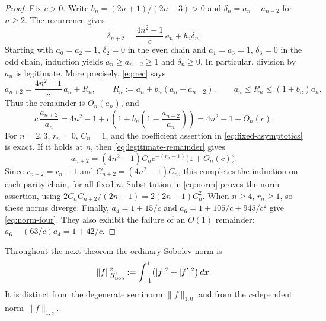 ﻿\documentclass[11pt]{article}
\begin{document}
\begin{proof}
	Fix $c>0$.  Write $b_n=(2n+1)/(2n-3)>0$ and
	$\delta_n=a_n-a_{n-2}$ for $n\ge2$.  The recurrence gives
	\begin{equation*}
		\delta_{n+2}=\frac{4n^2-1}{c}\,a_n+b_n\delta_n.
	\end{equation*}
	Starting with $a_0=a_2=1$, $\delta_2=0$ in the even chain and
	$a_1=a_3=1$, $\delta_3=0$ in the odd chain, induction yields
	$a_n\ge a_{n-2}\ge1$ and $\delta_n\ge0$.  In particular, division
	by $a_n$ is legitimate.  More precisely, \eqref{eq:rec} says
	\begin{equation}
		a_{n+2}=\frac{4n^2-1}{c}\,a_n+R_n,\qquad
		R_n:=a_n+b_n(a_n-a_{n-2}),\qquad
		a_n\le R_n\le(1+b_n)a_n.
		\label{eq:legitimate-remainder}
	\end{equation}
	Thus the remainder is $O_n(a_n)$, and
	\begin{equation}
		c\,\frac{a_{n+2}}{a_n}
		=4n^2-1+c\left(1+b_n\left(1-\frac{a_{n-2}}{a_n}\right)\right)
		=4n^2-1+O_n(c).
		\label{eq:normalized-ratio}
	\end{equation}
	For $n=2,3$, $r_n=0$, $C_n=1$, and the coefficient assertion in
	\eqref{eq:fixed-asymptotics} is exact.  If it holds at $n$, then
	\eqref{eq:legitimate-remainder} gives
	\begin{equation*}
		a_{n+2}
		=(4n^2-1)C_n c^{-(r_n+1)}\bigl(1+O_n(c)\bigr).
	\end{equation*}
	Since $r_{n+2}=r_n+1$ and $C_{n+2}=(4n^2-1)C_n$, this completes
	the induction on each parity chain, for all fixed $n$.  Substitution
	in \eqref{eq:norm} proves the norm assertion, using
	$2C_nC_{n+2}/(2n+1)=2(2n-1)C_n^2$.  When $n\ge4$, $r_n\ge1$,
	so these norms diverge.  Finally,
	$a_4=1+15/c$ and $a_6=1+105/c+945/c^2$ give
	\eqref{eq:norm-four}.  They also exhibit the failure of an $O(1)$
	remainder: $a_6-(63/c)a_4=1+42/c$.
\end{proof}

Throughout the next theorem the ordinary Sobolev norm is
\begin{equation*}
	\|f\|_{H^1_{\rm Sob}}^2
	:=\int_{-1}^1\bigl(|f|^2+|f'|^2\bigr)\,dx.
\end{equation*}
It is distinct from the degenerate seminorm $\|f\|_{1,0}$ and from the
$c$-dependent norm $\|f\|_{1,c}$.
\end{document}
